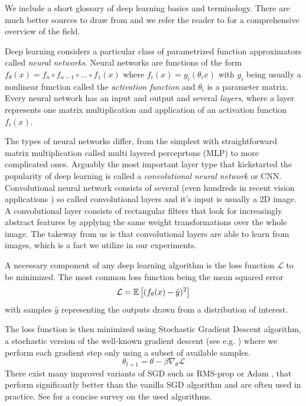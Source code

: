 We include a short glossary of deep learning basics and terminology. There are much better sources to draw from and we refer the reader to \citet{goodfellow2016deep} for a comprehensive overview of the field.

Deep learning considers a particular class of parametrized function approximators called \textit{neural networks}. 
Neural networks are functions of the form $f_\theta(x) = f_n \circ f_{n-1} \circ\hdots\circ  f_1(x)$ where $f_i(x) = g_i(\theta_i x)$ with $g_i$ being usually a nonlinear function called the \textit{activation function} and $\theta_i$ is a parameter matrix. Every neural network has an input and output and several \textit{layers}, where a layer represents one matrix multiplication and application of an activation function $f_i(x)$.

The types of neural networks differ, from the simplest with straightforward matrix multiplication called multi layered perceprtons (MLP) to more complicated ones. Arguably the most important layer type that kickstarted the popularity of deep learning is called a \textit{convolutional neural network} or CNN. Convolutional neural network consists of several (even hundreds in recent vision applications \cite{...}) so called convolutional layers and it's input is usually a 2D image. A convolutional layer consists of rectangular filters that look for increasingly abstract features by applying the same weight transformations over the whole image. The takeway from us is that convolutional layers are able to learn from images, which is a fact we utilize in our experiments.

A necessary component of any deep learning algorithm is the loss function $\mathcal{L}$ to be minimized. The most common loss function being the mean squared error
\begin{equation*}
\mathcal{L} = \mathbb{E}\left[ {(f_\theta(x) - \hat{y})^2} \right]
\end{equation*}
with samples $\hat{y}$ representing the outputs drawn from a distribution of interest. 

The loss function is then minimized using Stochastic Gradient Descent algorithm, a stochastic version of the well-known gradient descent (see e.g. \citet{boyd2004convex}) where we perform each gradient step only using a subset of available samples. 
\begin{equation}
\theta_{t+1} = \theta - \beta\nabla_\theta \mathcal{L}
\end{equation}
There exist many improved variants of SGD such as RMS-prop \cite{tieleman2012lecture} or Adam \citep{kingma2014adam}, that perform significantly better than the vanilla SGD algorithm and are often used in practice. See \citet{ruder2016overview} for a concise survey on the used algorithms.


